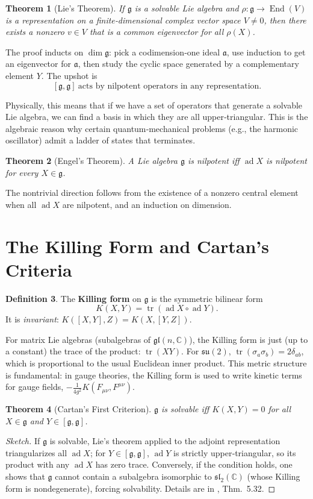 \documentclass{article}
\newtheorem{theorem}{Theorem}[section]
\theoremstyle{definition}
\newtheorem{definition}[theorem]{Definition}
\theoremstyle{remark}
\newcommand{\ad}{\operatorname{ad}}
\newcommand{\End}{\operatorname{End}}
\newcommand{\tr}{\operatorname{tr}}
\newcommand{\K}{K}
\newcommand{\g}{\mathfrak{g}}
\newcommand{\C}{\mathbb{C}}
\begin{document}
\begin{theorem}[Lie’s Theorem]
If $\g$ is a solvable Lie algebra and $\rho:\g\to\End(V)$ is a representation on
a finite‑dimensional complex vector space $V\neq0$, then there exists a nonzero
$v\in V$ that is a common eigenvector for all $\rho(X)$.
\end{theorem}

The proof inducts on $\dim\g$: pick a codimension‑one ideal $\mathfrak{a}$,
use induction to get an eigenvector for $\mathfrak{a}$, then study the cyclic
space generated by a complementary element $Y$.  The upshot is
\[
[\g,\g]\ \text{acts by nilpotent operators in any representation.}
\]

Physically, this means that if we have a set of operators that generate a solvable
Lie algebra, we can find a basis in which they are all upper‑triangular. This is
the algebraic reason why certain quantum‑mechanical problems (e.g., the harmonic
oscillator) admit a ladder of states that terminates.

\begin{theorem}[Engel’s Theorem]
A Lie algebra $\g$ is nilpotent iff $\ad X$ is nilpotent for every $X\in\g$.
\end{theorem}

The nontrivial direction follows from the existence of a nonzero central element
when all $\ad X$ are nilpotent, and an induction on dimension.

\section{The Killing Form and Cartan’s Criteria}

\begin{definition}
The \textbf{Killing form} on $\g$ is the symmetric bilinear form
\[
\K(X,Y) = \tr(\ad X \circ \ad Y).
\]
It is \emph{invariant}: $\K([X,Y],Z) = \K(X,[Y,Z])$.
\end{definition}
For matrix Lie algebras (subalgebras of $\mathfrak{gl}(n,\C)$), the Killing form
is just (up to a constant) the trace of the product: $\tr(XY)$. For $\mathfrak{su}(2)$,
$\tr(\sigma_a\sigma_b)=2\delta_{ab}$, which is proportional to the usual Euclidean
inner product. This metric structure is fundamental: in gauge theories, the Killing
form is used to write kinetic terms for gauge fields, $- \frac{1}{4g^2} \K(F_{\mu\nu},F^{\mu\nu})$.

\begin{theorem}[Cartan’s First Criterion]
$\g$ is solvable iff $\K(X,Y)=0$ for all $X\in\g$ and $Y\in[\g,\g]$.
\end{theorem}
\begin{proof}[Sketch]
If $\g$ is solvable, Lie’s theorem applied to the adjoint representation
triangularizes all $\ad X$; for $Y\in[\g,\g]$, $\ad Y$ is strictly
upper‑triangular, so its product with any $\ad X$ has zero trace.
Conversely, if the condition holds, one shows that $\g$ cannot contain a subalgebra
isomorphic to $\mathfrak{sl}_2(\C)$ (whose Killing form is nondegenerate),
forcing solvability.  Details are in \cite{Hall}, Thm.~5.32.
\end{proof}
\end{document}
